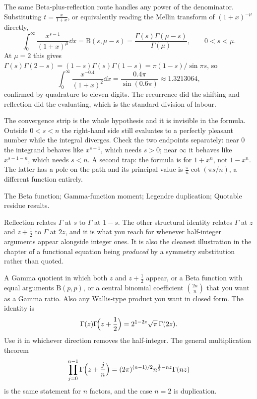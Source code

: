 \begin{worked}
The same Beta-plus-reflection route handles any power of the denominator. Substituting $t=\tfrac{x}{1+x}$, or equivalently reading the Mellin transform of $(1+x)^{-\mu}$ directly,
\[\int_0^{\infty}\frac{x^{s-1}}{(1+x)^{\mu}}\dd x=\mathrm{B}(s,\mu-s)=\frac{\Gamma(s)\Gamma(\mu-s)}{\Gamma(\mu)},\qquad 0<s<\mu.\]
At $\mu=2$ this gives $\Gamma(s)\Gamma(2-s)=(1-s)\Gamma(s)\Gamma(1-s)=\pi(1-s)/\sin\pi s$, so
\[\int_0^{\infty}\frac{x^{-0.4}}{(1+x)^{2}}\dd x=\frac{0.4\pi}{\sin(0.6\pi)}\approx1.3213064,\]
confirmed by quadrature to eleven digits. The recurrence did the shifting and reflection did the evaluating, which is the standard division of labour.
\end{worked}

\begin{trap}
The convergence strip is the whole hypothesis and it is invisible in the formula. Outside $0<s<n$ the right-hand side still evaluates to a perfectly pleasant number while the integral diverges. Check the two endpoints separately: near $0$ the integrand behaves like $x^{s-1}$, which needs $s>0$; near $\infty$ it behaves like $x^{s-1-n}$, which needs $s<n$. A second trap: the formula is for $1+x^{n}$, not $1-x^{n}$. The latter has a pole on the path and its principal value is $\frac{\pi}{n}\cot(\pi s/n)$, a different function entirely.
\end{trap}

\begin{seealsob}The Beta function; Gamma-function moment; Legendre duplication; Quotable residue results.\end{seealsob}

Reflection relates $\Gamma$ at $s$ to $\Gamma$ at $1-s$. The other structural identity relates $\Gamma$ at $z$ and $z+\tfrac12$ to $\Gamma$ at $2z$, and it is what you reach for whenever half-integer arguments appear alongside integer ones. It is also the cleanest illustration in the chapter of a functional equation being \emph{produced} by a symmetry substitution rather than quoted.

\cue A Gamma quotient in which both $z$ and $z+\tfrac12$ appear, or a Beta function with equal arguments $\mathrm{B}(p,p)$, or a central binomial coefficient $\binom{2n}{n}$ that you want as a Gamma ratio. Also any Wallis-type product you want in closed form.
\method The identity is
\[\Gamma(z)\Gamma\!\Bigl(z+\frac12\Bigr)=2^{1-2z}\sqrt{\pi}\,\Gamma(2z).\]
Use it in whichever direction removes the half-integer. The general multiplication theorem
\[\prod_{j=0}^{n-1}\Gamma\Bigl(z+\frac jn\Bigr)=(2\pi)^{(n-1)/2}n^{\frac12-nz}\Gamma(nz)\]
is the same statement for $n$ factors, and the case $n=2$ is duplication.

